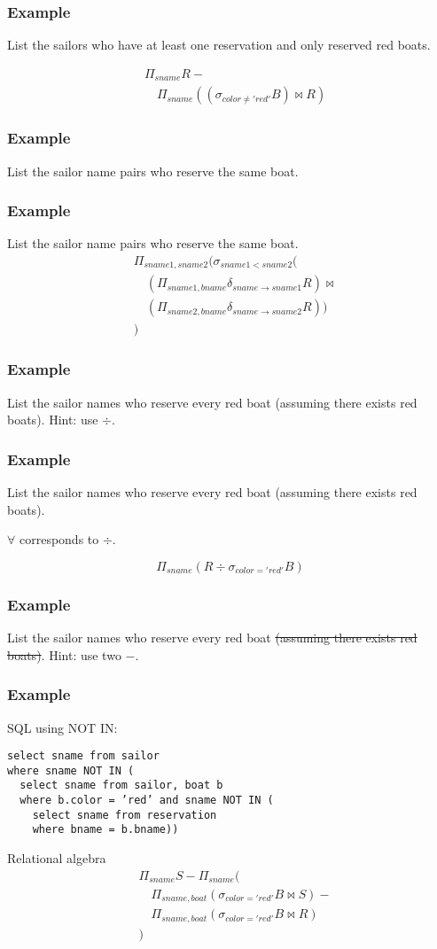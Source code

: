 \documentclass{beamer}
\begin{document}
\begin{frame}
\frametitle{Example}
List the sailors who have at least one reservation and only reserved red boats.  

\begin{align*}
& \Pi_{sname} R - \\
& \quad \Pi_{sname} ((\sigma_{color\neq 'red'} B) \bowtie R)
\end{align*}


\end{frame}

\begin{frame}
\frametitle{Example}
List the sailor name pairs who reserve the same boat. 
\end{frame}

\begin{frame}
\frametitle{Example}
List the sailor name pairs who reserve the same boat. 
\begin{align*}
& \Pi_{sname1, sname2} (\sigma_{sname1<sname2 }( \\
&\quad (\Pi_{sname1, bname} \delta_{sname \rightarrow sname1}R)\bowtie \\
&\quad (\Pi_{sname2, bname} \delta_{sname \rightarrow sname2}R))\\
&)
\end{align*}
\end{frame}

\begin{frame}
\frametitle{Example}
List the sailor names who reserve every red boat (assuming there exists red boats). Hint: use $\div$. 
\end{frame}

\begin{frame}
\frametitle{Example}
List the sailor names who reserve every red boat (assuming there exists red boats).

$\forall$ corresponds to $\div$.


$$
\Pi_{sname} (R\div \sigma_{color='red'} B)
$$
\end{frame}


\begin{frame}
\frametitle{Example}
List the sailor names who reserve every red boat \st{(assuming there exists red boats)}.
Hint: use two $-$. 
\end{frame}

\begin{frame}[fragile]
\frametitle{Example}
SQL using NOT IN:
\begin{verbatim}
select sname from sailor
where sname NOT IN (
  select sname from sailor, boat b 
  where b.color = ’red’ and sname NOT IN (
    select sname from reservation
    where bname = b.bname))
\end{verbatim}
Relational algebra
\begin{align*}
& \Pi_{sname} S - \Pi_{sname}(\\
& \quad \Pi_{sname, boat}(\sigma_{color='red'} B \bowtie S)-\\
& \quad \Pi_{sname, boat} (\sigma_{color='red'} B \bowtie R)\\
&)
\end{align*}
\end{frame}
\end{document}
